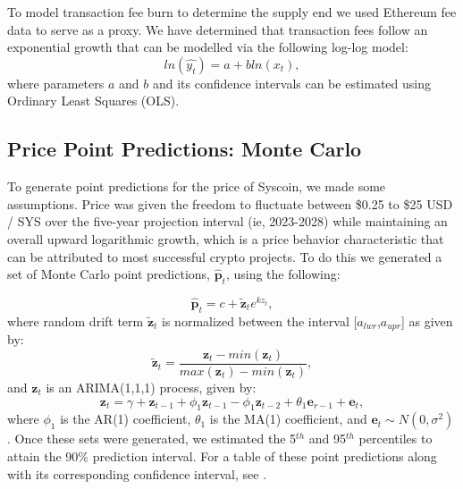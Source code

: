 \documentclass[journal,twocolumn,12pt]{ieeesyscoin}
\begin{document}
To model transaction fee burn to determine the supply end we used Ethereum fee data to serve as a proxy. We have determined that transaction fees follow an exponential growth that can be modelled via the following log-log model:
\begin{equation}
ln(\hat{y_{t}}) = a + bln(x_{t}),
\end{equation}
where parameters $a$ and $b$ and its confidence intervals can be estimated using Ordinary Least Squares (OLS).

\subsection{Price Point Predictions: Monte Carlo}
\label{appendix:monte_carlo}
To generate point predictions for the price of Syscoin, we made some assumptions. Price was given the freedom to fluctuate between \$0.25 to \$25 USD / SYS over the five-year projection interval (ie, 2023-2028) while maintaining an overall upward logarithmic growth, which is a price behavior characteristic that can be attributed to most successful crypto projects. To do this we generated a set of Monte Carlo point predictions, $\mathbf{\hat{p}}_{t}$, using the following:

\begin{equation}
\label{eqn:trend}
	\mathbf{\hat{p}}_{t} = c + \mathbf{\tilde{z}}_{t}e^{k z_{t}},
\end{equation}
where random drift term $\mathbf{\tilde{z}}_{t}$ is normalized between the interval [$a_{lwr}$,$a_{upr}$] as given by:
\begin{equation}
\label{eqn:min_max}
	\mathbf{\tilde{z}}_{t}= \frac{\mathbf{z}_{t} - min(\mathbf{z}_{t})}{max(\mathbf{z}_{t}) - min(\mathbf{z}_{t})},
\end{equation}
and $\mathbf{z}_{t}$ is an ARIMA(1,1,1) process, given by:
\begin{equation}
\label{eqn:drift}
	\mathbf{z}_{t} = \gamma + \mathbf{z}_{t-1} + \phi_{1} \mathbf{z}_{t-1} - \phi_{1} \mathbf{z}_{t-2} +  \theta_{1} \mathbf{e}_{r-1} + \mathbf{e}_{t},
\end{equation}
where $\phi_{1}$ is the AR(1) coefficient, $\theta_{1}$ is the MA(1) coefficient, and $\mathbf{e}_{t} \sim N(0, \sigma^2)$. Once these sets were generated, we estimated the 5$^{th}$ and 95$^{th}$ percentiles to attain the 90\% prediction interval. For a table of these point predictions along with its corresponding confidence interval, see \cite{Moo22A}. 
\end{document}
